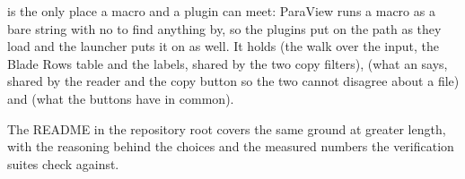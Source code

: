 \documentclass[11pt,a4paper]{article}
\begin{document}
 is the only place a macro and a plugin can meet: ParaView runs a
macro as a bare string with no  to find anything by, so the
plugins put  on the path as they load and the launcher puts it on
 as well. It holds  (the walk over the
input, the Blade Rows table and the labels, shared by the two copy filters),
 (what an  says, shared by the reader and
the copy button so the two cannot disagree about a file) and
 (what the buttons have in common).

The README in the repository root covers the same ground at greater length, with
the reasoning behind the choices and the measured numbers the verification
suites check against.
\end{document}
